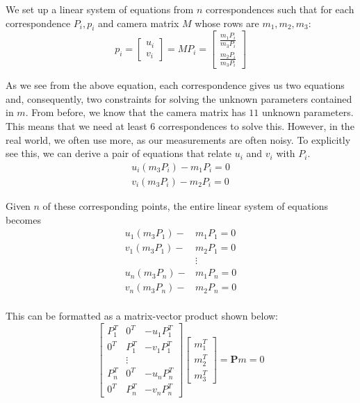 \documentclass[a4paper, 12pt]{article}
\begin{document}
We set up a linear system of equations from $n$ correspondences such that for each correspondence $P_i, p_i$ and camera matrix $M$ whose rows are $m_1, m_2, m_3$:
\begin{equation}
p_i = \begin{bmatrix}u_i\\v_i\end{bmatrix} = MP_i = \begin{bmatrix}\frac{m_1 P_i}{m_3P_i}\\\frac{m_2 P_i}{m_3P_i}\end{bmatrix}
\end{equation}

As we see from the above equation, each correspondence gives us two equations and, consequently, two constraints for solving the unknown parameters contained in $m$. From before, we know that the camera matrix has $11$ unknown parameters. This means that we need at least $6$ correspondences to solve this. However, in the real world, we often use more, as our measurements are often noisy. To explicitly see this, we can derive a pair of equations that relate $u_i$ and $v_i$ with $P_i$. 
\begin{align*}
u_i(m_3P_i) - m_1P_i = 0\\
v_i(m_3P_i) - m_2P_i = 0
\end{align*}

Given $n$ of these corresponding points, the entire linear system of equations becomes
\begin{align*}
u_1(m_3P_1) -& m_1P_1 = 0\\
v_1(m_3P_1) -& m_2P_1 = 0\\
&\vdots\\
u_n(m_3P_n) -& m_1P_n = 0\\
v_n(m_3P_n) -& m_2P_n = 0\\
\end{align*}

This can be formatted as a matrix-vector product shown below:
\begin{equation}
\begin{bmatrix} 
P_1^T & 0^T & -u_1P_1^T \\
0^T & P_1^T & -v_1P_1^T \\
& \vdots &\\
P_n^T & 0^T & -u_nP_n^T \\
0^T & P_n^T & -v_nP_n^T 
\end{bmatrix}
\begin{bmatrix}
m_1^T \\ m_2^T \\m_3^T
\end{bmatrix} = \mathbf{P}m = 0
\label{eq:linearsystem}
\end{equation}
\end{document}
